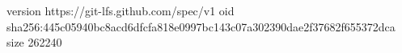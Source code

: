 version https://git-lfs.github.com/spec/v1
oid sha256:445c05940bc8acd6dfcfa818e0997bc143c07a302390dae2f37682f655372dca
size 262240
